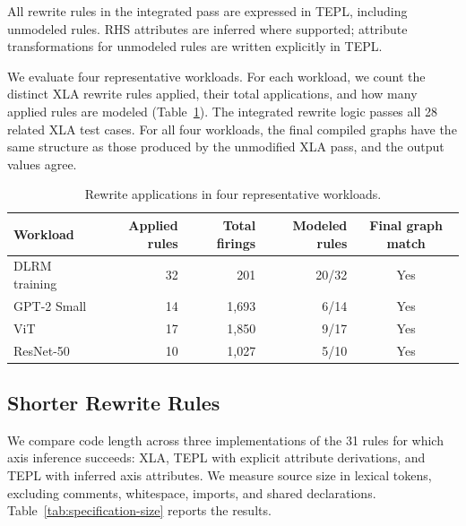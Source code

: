 All rewrite rules in the integrated pass are expressed in TEPL,
including unmodeled rules. RHS attributes are inferred where supported;
attribute transformations for unmodeled rules are written explicitly
in TEPL.

We evaluate four representative workloads. For each workload, we count
the distinct XLA rewrite rules applied, their total applications,
and how many applied rules are modeled
(Table~\ref{tab:algebraic-simplifier-workloads}).
The integrated rewrite logic passes all 28 related XLA test cases.
For all four workloads, the final compiled graphs have the same
structure as those produced by the unmodified XLA pass, and the
output values agree.

\begin{table}[!htbp]
\caption{Rewrite applications in four representative workloads.}
\label{tab:algebraic-simplifier-workloads}
\small
\begin{tabular*}{\linewidth}{@{\extracolsep{\fill}}lrrrc@{}}\toprule
Workload & Applied rules & Total firings & Modeled rules & Final graph match\\\midrule
DLRM training & 32 & 201 & 20/32 & Yes\\
GPT-2 Small & 14 & 1,693 & 6/14 & Yes\\
ViT & 17 & 1,850 & 9/17 & Yes\\
ResNet-50 & 10 & 1,027 & 5/10 & Yes\\\bottomrule
\end{tabular*}
\end{table}

\subsection{Shorter Rewrite Rules}
\label{sec:evaluation-size}
We compare code length across three implementations of the 31 rules
for which axis inference succeeds: XLA, TEPL with explicit attribute
derivations, and TEPL with inferred axis attributes.
We measure source size in lexical tokens, excluding comments,
whitespace, imports, and shared declarations.
Table~\ref{tab:specification-size} reports the results.

